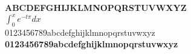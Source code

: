\documentclass{article}
\begin{document}
\vfill
\begin{center}
  \textbf{ABCDEFGHIJKLMNOPQRSTUVWXYZ}\\
  $\int_0^x e^{-t\pi} dx$\\
  0123456789abcdefghijklmnopqrstuvwxyz\\
  \textbf{0123456789abcdefghijklmnopqrstuvwxyz}
\end{center}
\vfill
\end{document}
